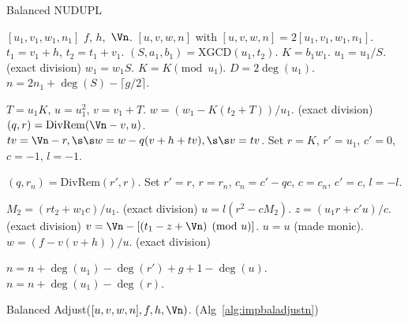 \begin{algorithm}[htbp]
\caption{Balanced NUDUPL}
\label{alg:balNudupl}
\begin{algorithmic}[1]
\Require $[u_1,v_1,w_1,n_1]$ $f$, $h,$ $\Vn$.
\Ensure $[u,v,w,n]$ with $[u,v,w,n] = 2[u_1,v_1,w_1,n_1]$.
\vspace{5pt}
\State $t_1 = v_1 + h$, $t_2 = t_1 + v_1$.
\State $(S,a_1,b_1) = \mathrm{XGCD}(u_1,t_2)$.
    \State $K = b_1w_1$.
        \State $u_1 = u_1/S$. \s\s\s (exact division) 
        \State $w_1 = w_1S$.
    \EndIf
    \State $K = K \pmod{u_1}$.
    \State $D = 2\deg(u_1)$.
    \State $n = 2n_1 + \deg(S) - \lceil g/2 \rceil$.

    \State $T = u_1K$, $u = u_1^2$, $v = v_1 + T$.
    \State $w = (w_1 - K(t_2 + T))/u_1$. \s\s\s (exact division)
        \State $(q,r) = \mathrm{DivRem}(\Vn - v,u)$.
        \State $tv = \Vn -r, \s\s w = w - q(v + h + tv), \s\s v = tv$.
    \EndIf 
\Else
    \State Set $r = K$, $r' = u_1$, $c' = 0$, $c = -1$, $l = -1$.
    
        \State $(q,r_n) = \mathrm{DivRem}(r',r)$.
        \State Set $r' = r$, $r = r_n$, $c_n = c' - qc$, $c = c_n$, $c' = c$, $l = -l.$
    \EndWhile

    \State $M_2 = (rt_2 + w_1c)/u_1.$ \s\s\s (exact division)
    \State $u = l(r^2 - cM_2).$
    \State $z = (u_1r + c'u)/c$. \s\s\s (exact division)
    \State $v = \Vn - [(t_1 - z + \Vn) \pmod{u}]$.
    \State $u = u$ (made monic).
    \State $w = (f - v(v + h))/u$. \s\s\s (exact division)

        \State $n = n + \deg(u_1) - \deg(r') + g + 1 - \deg(u)$.
    \Else
        \State $n = n + \deg(u_1) - \deg(r)$.
    \EndIf
\EndIf

\State \Return Balanced Adjust($[u,v,w,n], f,h,\Vn)$. (Alg~\ref{alg:impbaladjustn})
\end{algorithmic}
\end{algorithm}



